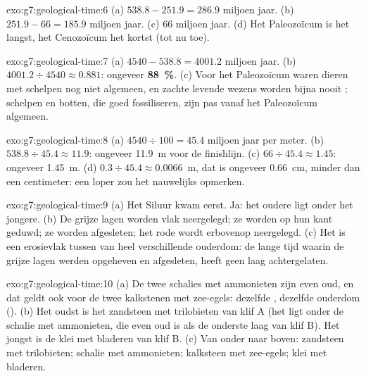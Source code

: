 \begin{solution}{exo:g7:geological-time:6}
(a) $538.8 - 251.9 = 286.9$ miljoen jaar. (b) $251.9 - 66 = 185.9$
miljoen jaar. (c) 66 miljoen jaar. (d) Het Paleozoïcum is het langst, het
Cenozoïcum het kortst (tot nu toe).
\end{solution}

\begin{solution}{exo:g7:geological-time:7}
(a) $4540 - 538.8 = 4001.2$ miljoen jaar. (b) $4001.2 \div 4540
\approx 0.881$: ongeveer \textbf{88~\%}. (c) Voor het Paleozoïcum waren
dieren met schelpen nog niet algemeen, en zachte levende wezens worden
bijna nooit ; schelpen en botten, die goed fossiliseren, zijn pas
vanaf het Paleozoïcum algemeen.
\end{solution}

\begin{solution}{exo:g7:geological-time:8}
(a) $4540 \div 100 = 45.4$ miljoen jaar per meter. (b) $538.8 \div 45.4
\approx 11.9$: ongeveer \qty{11.9}{m} voor de finishlijn. (c) $66 \div
45.4 \approx 1.45$: ongeveer \qty{1.45}{m}. (d) $0.3 \div 45.4 \approx
0.0066$~m, dat is ongeveer \qty{0.66}{cm}, minder dan een centimeter: een
loper zou het nauwelijks opmerken.
\end{solution}

\begin{solution}{exo:g7:geological-time:9}
(a) Het Siluur kwam eerst. Ja: het oudere  ligt onder het jongere.
(b) De grijze lagen worden vlak neergelegd; ze worden op hun kant geduwd;
ze worden afgesleten; het rode  wordt erbovenop neergelegd. (c) Het is
een erosievlak tussen  van heel verschillende ouderdom: de lange
tijd waarin de grijze lagen werden opgeheven en afgesleten, heeft geen
laag achtergelaten.
\end{solution}

\begin{solution}{exo:g7:geological-time:10}
(a) De twee schalies met ammonieten zijn even oud, en dat geldt ook voor
de twee kalkstenen met zee-egels: dezelfde , dezelfde ouderdom
(). (b) Het oudst is het zandsteen met
trilobieten van klif A (het ligt onder de schalie met ammonieten, die even
oud is als de onderste laag van klif B). Het jongst is de klei met
bladeren van klif B. (c) Van onder naar boven: zandsteen met trilobieten;
schalie met ammonieten; kalksteen met zee-egels; klei met bladeren.
\end{solution}

